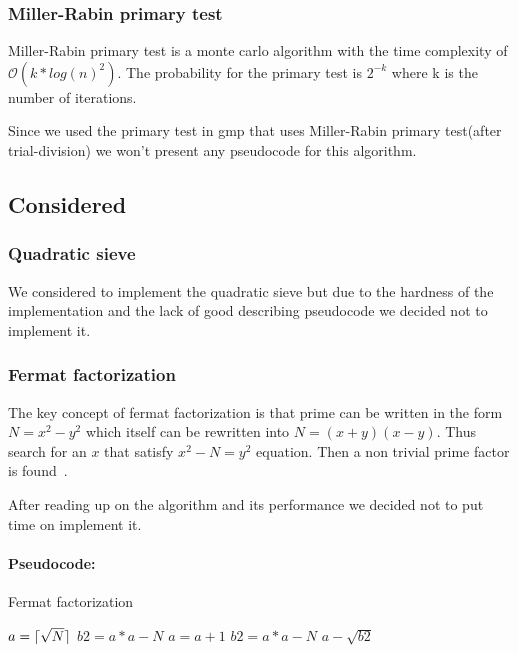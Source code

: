 \subsubsection{Miller-Rabin primary test}

Miller-Rabin primary test is a monte carlo algorithm with the time complexity of $\mathcal{O}(k*log(n)^2)$. The
probability for the primary test is $2^{-k}$ where k is the number of iterations.

Since we used the primary test in gmp that uses Miller-Rabin primary test(after trial-division) we won’t present any pseudocode for this algorithm.

\subsection{Considered}

\subsubsection{Quadratic sieve}

We considered to implement the quadratic sieve but due to the hardness of the implementation and the lack of good describing pseudocode we decided not to implement it.

\subsubsection{Fermat factorization}

The key concept of fermat factorization is that prime can be written in the form $N = x^2 - y^2$ which itself can be rewritten into $N = (x+y)(x-y)$. Thus search for an $x$ that satisfy $x^2 - N = y^2$ equation. Then a non trivial prime factor is found~\cite{fermat}.   

After reading up on the algorithm and its performance we decided not to put time on implement it.

\paragraph{Pseudocode:}

\textcolor{white}{ }

\begin{algorithm}[H]
\caption{Fermat factorization}
\begin{algorithmic}
	\State $a = \lceil\sqrt{N}\rceil$
	\State $b2 = a*a - N$
		\State $a = a + 1$
		\State $b2 = a*a - N$
	\EndWhile	
	\State \Return $a - \sqrt{b2}$
\EndFunction
\end{algorithmic}
\end{algorithm}